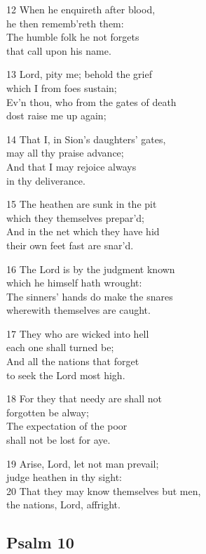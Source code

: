 \begin{multicols}{3}
12 When he enquireth after blood,\\
he then rememb’reth them:\\
The humble folk he not forgets\\
that call upon his name.

13 Lord, pity me; behold the grief\\
which I from foes sustain;\\
Ev’n thou, who from the gates of death\\
dost raise me up again;

14 That I, in Sion’s daughters’ gates,\\
may all thy praise advance;\\
And that I may rejoice always\\
in thy deliverance.

15 The heathen are sunk in the pit\\
which they themselves prepar’d;\\
And in the net which they have hid\\
their own feet fast are snar’d.

16 The Lord is by the judgment known\\
which he himself hath wrought:\\
The sinners’ hands do make the snares\\
wherewith themselves are caught.

17 They who are wicked into hell\\
each one shall turned be;\\
And all the nations that forget\\
to seek the Lord most high.

18 For they that needy are shall not\\
forgotten be alway;\\
The expectation of the poor\\
shall not be lost for aye.

19 Arise, Lord, let not man prevail;\\
judge heathen in thy sight:\\
20 That they may know themselves but men,\\
the nations, Lord, affright.

\begin{center}
\quad{}\quad{}
\end{center}

\subsection*{Psalm 10 }


\end{multicols}
